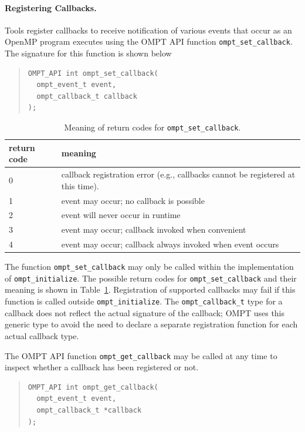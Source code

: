 \documentclass{article}
\begin{document}
\paragraph{Registering Callbacks.} 
Tools register callbacks to receive notification of various events that occur as an OpenMP program executes using the OMPT API function \verb|ompt_set_callback|. The signature for this function is shown below{
 
\begin{quote}
\begin{verbatim}
OMPT_API int ompt_set_callback(
  ompt_event_t event, 
  ompt_callback_t callback
);
\end{verbatim}
\end{quote}


\begin{table}
\centering
\begin{tabular}{|l|l|}
\hline
return code & meaning \\\hline
0 & callback registration error (e.g., callbacks cannot be registered at this time).\\\hline
1 & event may occur; no callback is possible\\\hline
2 & event will never occur in runtime\\\hline
3 & event may occur; callback invoked when convenient\\\hline
4 & event may occur; callback always invoked when event occurs\\\hline
\end{tabular}
\caption{Meaning of return codes for {\tt ompt\_set\_callback}.}
\label{table:set_rc}
\end{table}

\noindent
The  function \verb|ompt_set_callback|  may only be called within the implementation of 
 \verb|ompt_initialize|.
The possible return codes for \verb|ompt_set_callback| and their meaning is shown in Table~\ref{table:set_rc}. 
Registration of supported callbacks may fail if this function is
called outside  \verb|ompt_initialize|.
The \verb|ompt_callback_t| type for a callback does not reflect the actual signature of the callback; OMPT uses  this generic type 
 to avoid the need to declare a separate registration function for each actual callback type.


The  OMPT API function \verb|ompt_get_callback| may be called at any time to inspect whether a callback has been registered or not. 

\begin{quote}
\begin{verbatim}
OMPT_API int ompt_get_callback(
  ompt_event_t event, 
  ompt_callback_t *callback
);
\end{verbatim}
\end{quote}

}
\end{document}
